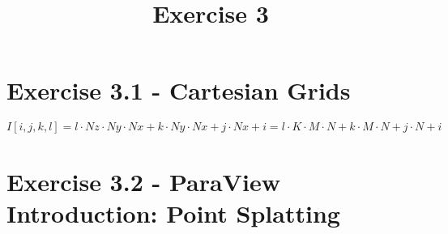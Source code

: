 \documentclass[a4paper]{article}
\date{}
\author{}
\title{Exercise 3}
\begin{document}
	
	\maketitle 
	\thispagestyle{fancy}
	
	\section*{Exercise 3.1 - Cartesian Grids}
	$I[i, j, k, l] = l \cdot Nz \cdot Ny \cdot Nx + k \cdot Ny \cdot Nx  + j \cdot Nx + i
	 = l \cdot K \cdot M \cdot N + k \cdot M \cdot N  + j \cdot N + i$
		
	
	\section*{Exercise 3.2 - ParaView Introduction: Point Splatting}
	
	
\end{document}
